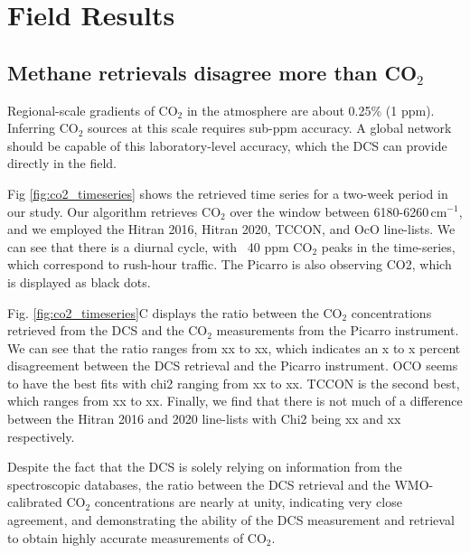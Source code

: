 \documentclass[amt, manuscript]{copernicus}
\begin{document}
\section{Field Results}
\subsection{Methane retrievals disagree more than CO$_2$}

Regional-scale gradients of CO$_2$ in the atmosphere are about 0.25\% (1 ppm). Inferring CO$_2$ sources at this scale requires sub-ppm accuracy. A global network should be capable of this laboratory-level accuracy, which the DCS can provide directly in the field.

Fig \ref{fig:co2_timeseries} shows the retrieved time series for a two-week period in our study. Our algorithm retrieves CO$_2$ over the window between 6180-6260\,cm$^{-1}$, and we employed the Hitran 2016, Hitran 2020, TCCON, and OcO line-lists. We can see that there is a diurnal cycle, with ~40 ppm CO$_2$ peaks in the time-series, which correspond to rush-hour traffic. The Picarro is also observing CO2, which is displayed as black dots.

Fig. \ref{fig:co2_timeseries}C displays the ratio between the CO$_2$ concentrations retrieved from the DCS and the CO$_2$ measurements from the Picarro instrument. We can see that the ratio ranges from xx to xx, which indicates an x to x percent disagreement between the DCS retrieval and the Picarro instrument. OCO seems to have the best fits with chi2 ranging from xx to xx. TCCON is the second best, which ranges from xx to xx. Finally, we find that there is not much of a difference between the Hitran 2016 and 2020 line-lists with Chi2 being xx and xx respectively.

Despite the fact that the DCS is solely relying on information from the spectroscopic databases, the ratio between the DCS retrieval and the WMO-calibrated CO$_2$ concentrations are nearly at unity, indicating very close agreement, and demonstrating the ability of the DCS measurement and retrieval to obtain highly accurate measurements of CO$_2$.
\end{document}
